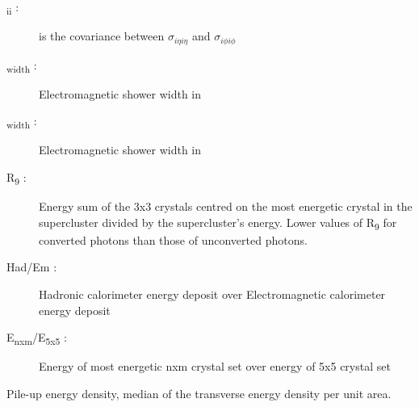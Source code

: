 \begin{description}
\begin{description}
		\item [\textsigma\textsubscript{i\texteta i\textphi} :] is the covariance between $ \sigma_{i \eta i \eta}$ and $ \sigma_{i \phi i \phi}$
    \\
		\item [\texteta\textsubscript{width} \: \textgamma :] Electromagnetic shower width in \texteta
    \item [\textphi\textsubscript{width} \: \textgamma :] Electromagnetic shower width in \textphi
	\item [R\textsubscript{9} \: \textgamma :] Energy sum of the 3x3 crystals centred on the most energetic crystal in
    the supercluster divided by the supercluster's energy. Lower values of R\textsubscript{9} for converted photons than those of unconverted photons.
	\item [Had/Em :] Hadronic calorimeter energy deposit over Electromagnetic calorimeter energy deposit
    \item [E\textsubscript{nxm}/E\textsubscript{5x5} :] Energy of most energetic nxm crystal set over energy of 5x5 crystal set
    \end{description}
    \item [\textrho :] Pile-up energy density, median of the transverse energy density per unit area.
\end{description}

